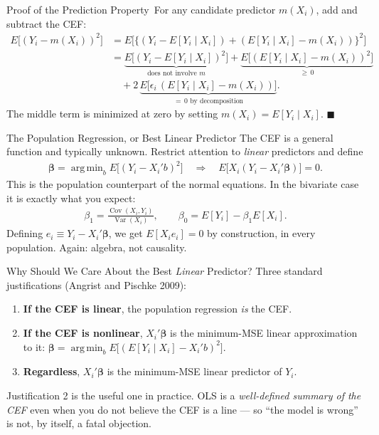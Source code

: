 \documentclass[aspectratio=169,11pt,xcolor=dvipsnames]{beamer}
\newcommand{\srcp}[1]{{\scriptsize\color{gray}(#1)}}   %
\DeclareMathOperator*{\argmin}{arg\,min}
\DeclareMathOperator{\Cov}{Cov}
\DeclareMathOperator{\Var}{Var}
\newcommand{\E}{E}
\newcommand{\adv}{\,\raisebox{0.6pt}{\textcolor{accent}{$\bigstar$}}}
\begin{document}
\begin{frame}{Proof of the Prediction Property\adv}
For any candidate predictor $m(X_i)$, add and subtract the CEF:
\begin{align*}
  \E\big[(Y_i - m(X_i))^2\big]
  &= \E\Big[\big\{ (Y_i - \E[Y_i\mid X_i]) + (\E[Y_i\mid X_i] - m(X_i)) \big\}^2\Big]\\[2pt]
  &= \underbrace{\E\big[(Y_i-\E[Y_i\mid X_i])^2\big]}_{\text{does not involve } m}
   + \underbrace{\E\big[(\E[Y_i\mid X_i] - m(X_i))^2\big]}_{\geq\, 0}\\
  &\quad + 2\,\underbrace{\E\big[\epsilon_i\,(\E[Y_i\mid X_i]-m(X_i))\big]}_{=\,0
    \text{ by decomposition}} .
\end{align*}
The middle term is minimized at zero by setting $m(X_i)=\E[Y_i\mid X_i]$.
$\blacksquare$
\end{frame}

\begin{frame}{The Population Regression, or Best Linear Predictor}
The CEF is a general function and typically unknown. Restrict attention to
\emph{linear} predictors and define
\begin{align*}
  \bm\beta = \argmin_{b} \E\big[(Y_i - X_i'b)^2\big]
  \quad\Longrightarrow\quad
  \E\big[X_i(Y_i - X_i'\bm\beta)\big] = 0 .
\end{align*}
This is the population counterpart of the normal equations. In the bivariate case
it is exactly what you expect:
\begin{align*}
  \beta_1 = \frac{\Cov(X_i, Y_i)}{\Var(X_i)},
  \qquad
  \beta_0 = \E[Y_i] - \beta_1 \E[X_i] .
\end{align*}
\vskip4pt
Defining $e_i \equiv Y_i - X_i'\bm\beta$, we get $\E[X_ie_i]=0$
\alert{by construction}, in every population. Again: algebra, not causality.
\end{frame}

\begin{frame}{Why Should We Care About the Best \emph{Linear} Predictor?}
Three standard justifications \srcp{Angrist and Pischke 2009}:
\begin{enumerate}\itemsep6pt
  \item \textbf{If the CEF is linear}, the population regression \emph{is} the CEF.
  \item \textbf{If the CEF is nonlinear}, $X_i'\bm\beta$ is the minimum-MSE linear
        approximation to it:
        $\bm\beta = \argmin_b \E\big[(\E[Y_i\mid X_i] - X_i'b)^2\big]$.
  \item \textbf{Regardless}, $X_i'\bm\beta$ is the minimum-MSE linear predictor
        of $Y_i$.
\end{enumerate}
\vskip6pt
\pause
Justification 2 is the useful one in practice. OLS is a \emph{well-defined
summary of the CEF} even when you do not believe the CEF is a line --- so
``the model is wrong'' is not, by itself, a fatal objection.
\end{frame}
\end{document}
